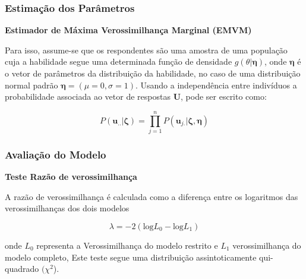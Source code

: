 \documentclass{beamer}
\begin{document}
	\begin{frame}
		
		\frametitle{Estimação dos Parâmetros }
		
		\begin{center}
			\textbf{Estimador de Máxima Verossimilhança Marginal (EMVM)}
		\end{center}
		
					
		Para isso, assume-se que os respondentes são uma amostra de uma população cuja a habilidade segue uma determinada função de densidade $g(\theta|\boldsymbol{\eta})$, onde $\boldsymbol{\eta}$ é o vetor de parâmetros da distribuição da habilidade, no caso de uma distribuição normal padrão $\boldsymbol{\eta} = (\mu = 0, \sigma = 1) $. Usando a independência entre indivíduos a probabilidade associada ao vetor de respostas $\boldsymbol{U}$, pode ser escrito como:
		
		\[
		P(\boldsymbol{u}_{..}|\boldsymbol{\zeta}) = \prod_{j=1}^{n}P(\boldsymbol{u}_{j.}|\boldsymbol{\zeta}, \boldsymbol{\eta})
		\]
		
		
		
		
	\end{frame}
	\begin{comment}
		\begin{frame}
			
			\frametitle{Estimação dos Parâmetros }
			
			
			\begin{block}{Estimação Bayesiana}
				
				A abordagem bayesiana é usada para estimar os parâmetros da TRI com base na distribuição \textit{a priori} dos parâmetros. Ela incorpora informações prévias sobre os parâmetros e atualiza essas informações com base nas respostas dos participantes.\\ 
				
			\end{block}
			
		\end{frame}
	\end{comment}
	
\begin{frame}
		
		\frametitle{Avaliação do Modelo}
		
	   \begin{center}
	   	\textbf{Teste Razão de verossimilhança} 
	   	\hfill
	   \end{center}
		
		A razão de verossimilhança é calculada como a diferença entre os logaritmos das verossimilhanças dos dois modelos
		
		\[
		\lambda = -2 (\text{log} L_0 - \text{log} L_1)
		\]
		
		onde $L_0$ representa a Verossimilhança do modelo restrito e
		$L_1$ verossimilhança do modelo completo, Este teste segue uma distribuição assintoticamente qui-quadrado $(\chi^2$).
		
	\end{frame}	
\end{document}
